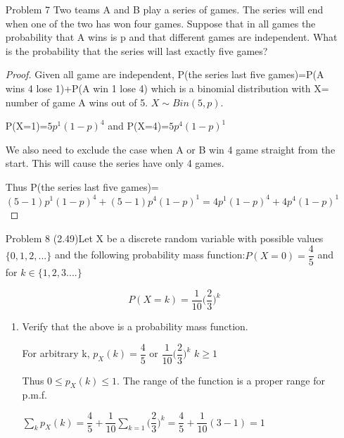 \documentclass[11pt, oneside]{article}
\begin{document}
\begin{enumerate}
\begin{proof}
    P(Getting hurt when jump 50 times) =$\text{P(Not getting hurt when jump 50 times)}^c$
    
    Since each jump is independent, P(Not getting hurt when jump 50 times)= P(Not getting hurt when jump 1 time)$^{50}$= $(\dfrac{49}{50})^{50}\approx 0.3641$
    
    Thus P(Getting hurt when jump 50 times)= 1-0.3641=0.6359.
    \end{proof}
    
    \item [Problem 7]
    Two teams A and B play a series of games. The series will end when one of the two has won four games. Suppose that in all games the probability that A wins is p and that different games are independent. What is the probability that the series will last exactly five games?
    
    \begin{proof}
    Given all game are independent, P(the series last five games)=P(A wins 4 lose 1)+P(A win 1 lose 4) which is a binomial distribution with X= number of game A wins out of 5. $X\sim Bin(5,p)$. 
    
    P(X=1)=$5p^1(1-p)^4$ and P(X=4)=$5p^4(1-p)^1$
    
    We also need to exclude the case when A or B win 4 game straight from the start. This will cause the series have only 4 games. 
    
    Thus P(the series last five games)=$(5-1)p^1(1-p)^4+(5-1)p^4(1-p)^1=4p^1(1-p)^4+4p^4(1-p)^1 $
    \end{proof}
    
    \item[Problem 8]
    (2.49)Let X be a discrete random variable with possible values$\{0,1,2,...\}$ and the following probability mass function:$P(X=0)=\dfrac{4}{5}$ and for $k\in \{1,2,3....\}$
    
    \[P(X=k)=\dfrac{1}{10}\big( \dfrac{2}{3}\big)^k\]
    
    \begin{enumerate}
        \item Verify that the above is a probability mass function.
        
        For arbitrary k, $p_X(k)=\dfrac{4}{5}$ or $\dfrac{1}{10}\big( \dfrac{2}{3}\big)^k$ $ k\geq 1$
        
        Thus $0\leq p_X(k)\leq 1$. The range of the function is a proper range for p.m.f.
        
        $\sum_k p_X(k)= \dfrac{4}{5}+ \dfrac{1}{10}\sum_{k=1}\big(\dfrac{2}{3} \big)^k= \dfrac{4}{5}+\dfrac{1}{10}(3-1)=1$
        

\end{enumerate}
\end{enumerate}
\end{document}
